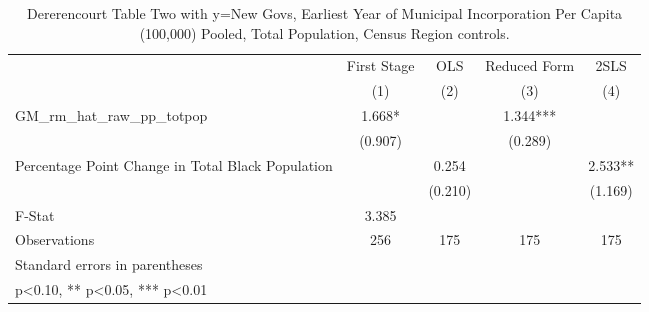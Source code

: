 \begin{table}[htbp]\centering
\def\sym#1{\ifmmode^{#1}\else\(^{#1}\)\fi}
\caption{Dererencourt Table Two with y=New Govs, Earliest Year of Municipal Incorporation Per Capita (100,000) Pooled, Total Population, Census Region controls.}
\begin{tabular}{l*{4}{c}}
\toprule
                    & First Stage   &         OLS   &Reduced Form   &        2SLS   \\
                    &\multicolumn{1}{c}{(1)}   &\multicolumn{1}{c}{(2)}   &\multicolumn{1}{c}{(3)}   &\multicolumn{1}{c}{(4)}   \\
\midrule
GM\_rm\_hat\_raw\_pp\_totpop&       1.668*  &               &       1.344***&               \\
                    &     (0.907)   &               &     (0.289)   &               \\
\addlinespace
Percentage Point Change in Total Black Population&               &       0.254   &               &       2.533** \\
                    &               &     (0.210)   &               &     (1.169)   \\
\midrule
F-Stat              &       3.385   &               &               &               \\
Observations        &         256   &         175   &         175   &         175   \\
\bottomrule
\multicolumn{5}{l}{\footnotesize Standard errors in parentheses}\\
\multicolumn{5}{l}{\footnotesize * p<0.10, ** p<0.05, *** p<0.01}\\
\end{tabular}
\end{table}
